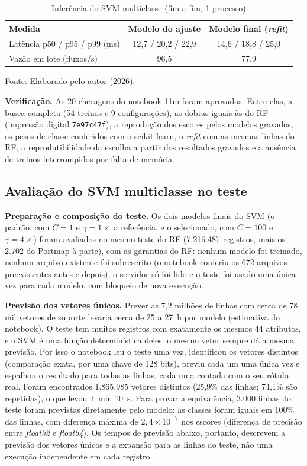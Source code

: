 \documentclass[
    12pt,                %
    openright,           %
    oneside,             %
    a4paper,             %
    english,             %
    brazil               %
]{abntex2}
\begin{document}
\begin{table}
\centering
\caption{Inferência do SVM multiclasse (fim a fim, 1 processo)}
\label{tab:svm-multi-inferencia}
\begin{tabular}{lcc}
\hline
Medida & Modelo do ajuste & Modelo final (\textit{refit}) \\
\hline
Latência p50 / p95 / p99 (ms) & 12,7 / 20,2 / 22,9 & 14,6 / 18,8 / 25,0 \\
Vazão em lote (fluxos/s) & 96,5 & 77,9 \\
\hline
\end{tabular}
\par\smallskip
Fonte: Elaborado pelo autor (2026).
\end{table}
 
\textbf{Verificação.} As 20 checagens do notebook 11m foram aprovadas. Entre elas, a busca completa (54 treinos e 9 configurações), as dobras iguais às do RF (impressão digital \texttt{7e97c47f}), a reprodução dos escores pelos modelos gravados, os pesos de classe conferidos com o scikit-learn, o \textit{refit} com as mesmas linhas do RF, a reprodutibilidade da escolha a partir dos resultados gravados e a ausência de treinos interrompidos por falta de memória.
 
 
\subsection{Avaliação do SVM multiclasse no teste}
\label{sec:svm-multi-teste}
 
\textbf{Preparação e composição do teste.} Os dois modelos finais do SVM (o padrão, com $C = 1$ e $\gamma = 1\times$ a referência, e o selecionado, com $C = 100$ e $\gamma = 4\times$) foram avaliados no mesmo teste do RF (7.216.487 registros, mais os 2.702 do Portmap à parte), com as garantias do RF: nenhum modelo foi treinado, nenhum arquivo existente foi sobrescrito (o notebook conferiu os 672 arquivos preexistentes antes e depois), o servidor só foi lido e o teste foi usado uma única vez para cada modelo, com bloqueio de nova execução.
 
\textbf{Previsão dos vetores únicos.} Prever as 7,2 milhões de linhas com cerca de 78 mil vetores de suporte levaria cerca de 25 a 27~h por modelo (estimativa do notebook). O teste tem muitos registros com exatamente os mesmos 44 atributos, e o SVM é uma função determinística deles: o mesmo vetor sempre dá a mesma previsão. Por isso o notebook leu o teste uma vez, identificou os vetores distintos (comparação exata, por uma chave de 128 bits), previu cada um uma única vez e espalhou o resultado para todas as linhas, cada uma contada com o seu rótulo real. Foram encontrados 1.865.985 vetores distintos (25,9\% das linhas; 74,1\% são repetidas), o que levou 2~min 10~s. Para provar a equivalência, 3.000 linhas do teste foram previstas diretamente pelo modelo: as classes foram iguais em 100\% das linhas, com diferença máxima de $2{,}4\times10^{-7}$ nos escores (diferença de precisão entre \textit{float32} e \textit{float64}). Os tempos de previsão abaixo, portanto, descrevem a previsão dos vetores únicos e a expansão para as linhas do teste, não uma execução independente em cada registro.
 
\end{document}
